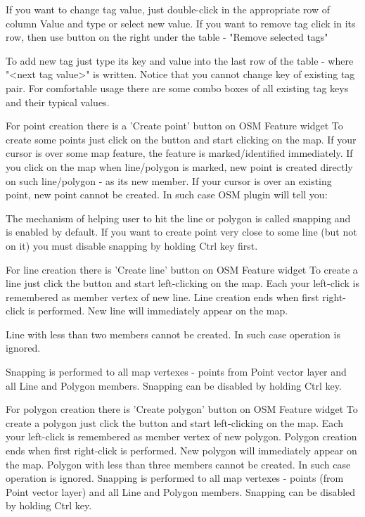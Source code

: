 If you want to change tag value, just double-click in the appropriate row of
column Value and type or select new value. If you want to remove tag click in
its row, then use button on the right under the table - "Remove selected
tags"

To add new tag just type its key and value into the last row of the table -
where "<next tag value>" is written. Notice that you cannot change key of
existing tag pair. For comfortable usage there are some combo boxes of all
existing tag keys and their typical values.


For point creation there is a 'Create point' button on OSM Feature widget   
To create some points just click on the button and start clicking on the map.
If your cursor is over some map feature, the feature is marked/identified
immediately. If you click on the map when line/polygon is marked, new point
is created directly on such line/polygon - as its new member.
If your cursor is over an existing point, new point cannot be created.
In such case OSM plugin will tell you:

The mechanism of helping user to hit the line or polygon is called snapping
and is enabled by default. If you want to create point very close to some
line (but not on it) you must disable snapping by holding Ctrl key first.


For line creation there is 'Create line' button on OSM Feature widget   
To create a line just click the button and start left-clicking on the map.
Each your left-click is remembered as member vertex of new line. Line
creation ends when first right-click is performed. New line will immediately
appear on the map.

Line with less than two members cannot be created. In such case operation is
ignored.

Snapping is performed to all map vertexes - points from Point vector layer
and all Line and Polygon members.
Snapping can be disabled by holding Ctrl key.


For polygon creation there is 'Create polygon' button on OSM Feature widget   
To create a polygon just click the button and start left-clicking on the map.
Each your left-click is remembered as member vertex of new polygon. Polygon
creation ends when first right-click is performed. New polygon will
immediately appear on the map.
Polygon with less than three members cannot be created. In such case
operation is ignored.
Snapping is performed to all map vertexes - points (from Point vector layer)
and all Line and Polygon members.
Snapping can be disabled by holding Ctrl key.

